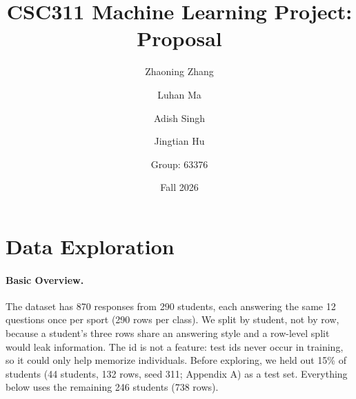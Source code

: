 \documentclass[11pt,titlepage]{article}
\title{CSC311 Machine Learning Project: Proposal}
\author{Zhaoning Zhang\and Luhan Ma \and Adish Singh \and Jingtian Hu \and Group: 63376}
\date{Fall 2026}
\begin{document}
\maketitle


\section{Data Exploration}\label{sec:data-exploration}

\paragraph{Basic Overview.}
The dataset has 870 responses from 290 students, each answering the same 12 questions once per sport (290 rows per class). We split by student, not by row, because a student’s three rows share an answering style and a row-level split would leak information. The id is not a feature: test ids never occur in training, so it could only help memorize individuals. Before exploring, we held out 15\% of students (44 students, 132 rows, seed 311; Appendix A) as a test set. Everything below uses the remaining 246 students (738 rows).
\end{document}
